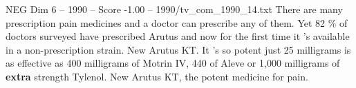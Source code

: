 \begin{textsample}{NEG Dim 6 – 1990 – Score -1.00 – 1990/tv\_com\_1990\_14.txt}  \label{ex:f6_neg_029}
There are many prescription pain medicines and a doctor can prescribe any of them.
Yet 82 \% of doctors surveyed have prescribed Arutus and now for the first time it 's available in a non-prescription strain.
New Arutus KT.
It 's so potent just 25 milligrams is as effective as 400 milligrams of Motrin IV, 440 of Aleve or 1,000 milligrams of \textbf{extra} strength Tylenol.
New Arutus KT, the potent medicine for pain.

\end{textsample}

